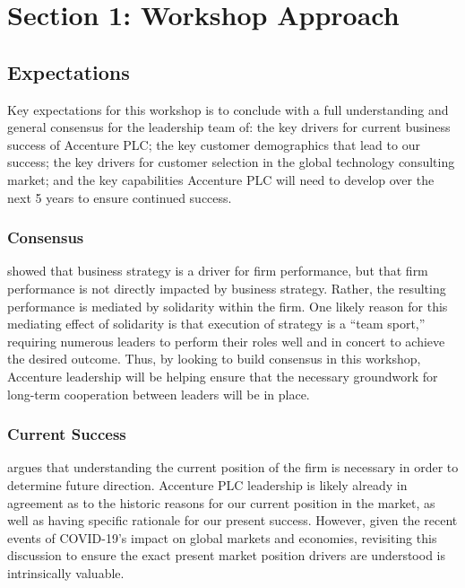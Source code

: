 \section{Section 1: Workshop Approach}

\subsection{Expectations}

Key expectations for this workshop is to conclude with a full understanding and general consensus for the leadership team of: the key drivers for current business success of Accenture PLC; the key customer demographics that lead to our success; the key drivers for customer selection in the global technology consulting market; and the key capabilities Accenture PLC will need to develop over the next 5 years to ensure continued success.

\subsubsection{Consensus}

\textcite{sriviboonStrategyPerformanceInterrelation2020} showed that business strategy is a driver for firm performance, but that firm performance is not directly impacted by business strategy. Rather, the resulting performance is mediated by solidarity within the firm. One likely reason for this mediating effect of solidarity is that execution of strategy is a ``team sport,'' requiring numerous leaders to perform their roles well and in concert to achieve the desired outcome. Thus, by looking to build consensus in this workshop, Accenture leadership will be helping ensure that the necessary groundwork for long-term cooperation between leaders will be in place.

\subsubsection{Current Success}

\textcite{Tracy2015} argues that understanding the current position of the firm is necessary in order to determine future direction. Accenture PLC leadership is likely already in agreement as to the historic reasons for our current position in the market, as well as having specific rationale for our present success. However, given the recent events of COVID-19's impact on global markets and economies, revisiting this discussion to ensure the exact present market position drivers are understood is intrinsically valuable.

